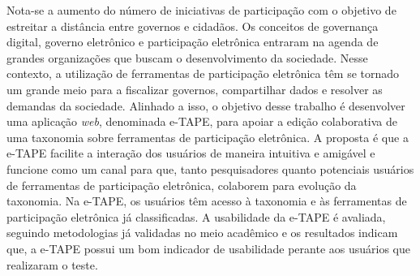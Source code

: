 \newpage
\begin{resumo}
Nota-se a aumento do número de iniciativas de participação com o objetivo de estreitar a distância entre governos e cidadãos. Os conceitos de governança digital, governo eletrônico
e participação eletrônica entraram na agenda de grandes organizações que buscam o desenvolvimento da sociedade. Nesse contexto, a utilização de ferramentas de participação eletrônica
têm se tornado um grande meio para a fiscalizar governos, compartilhar dados e resolver as demandas da sociedade.
Alinhado a isso, o objetivo desse trabalho é desenvolver uma aplicação \textit{web}, denominada e-TAPE, para apoiar a edição colaborativa de uma taxonomia sobre 
ferramentas de participação eletrônica. A proposta é que a e-TAPE facilite a interação dos usuários de maneira intuitiva e amigável e funcione como um canal para que, 
tanto pesquisadores quanto potenciais usuários de ferramentas de participação eletrônica, colaborem para evolução da taxonomia. 
Na e-TAPE, os usuários têm acesso à taxonomia e às ferramentas de participação eletrônica já classificadas.
 A usabilidade da e-TAPE é avaliada, seguindo metodologias já validadas no meio acadêmico e os resultados indicam que, a e-TAPE possui um bom indicador de usabilidade perante aos 
 usuários que realizaram o teste. 
\end{resumo}
\newpage